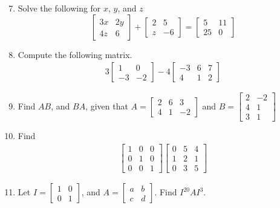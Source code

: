 \documentclass[12pt]{article}
\begin{document}
\begin{enumerate}
\setcounter{enumi}{6}

\item Solve the following for $x$, $y$, and $z$
\[\begin{bmatrix}
3x & 2y \\ 
4z & 6
\end{bmatrix} +
\begin{bmatrix}
2 & 5 \\
z & -6
\end{bmatrix} =
\begin{bmatrix}
5 & 11 \\
25 & 0
\end{bmatrix}\]

\item Compute the following matrix.
\begin{align*}
3\begin{bmatrix}
1 & 0 \\
-3 & -2
\end{bmatrix} -4
\begin{bmatrix}
-3 & 6 & 7\\
4  & 1 & 2
\end{bmatrix}
\end{align*}

\item Find $AB$, and $BA$, given that $A=\begin{bmatrix}
2 & 6 & 3 \\
4 & 1 & -2
\end{bmatrix}$ and $B=\begin{bmatrix}
2 & -2 \\
4 & 1 \\
3 & 1
\end{bmatrix}$

\item Find
\begin{align*}
	\begin{bmatrix}
		1 & 0 & 0 \\
		0 & 1 & 0 \\
		0 & 0 & 1
	\end{bmatrix}
	\begin{bmatrix}
		0 & 5 & 4 \\
		1 & 2 & 1 \\
		0 & 3 & 5
	\end{bmatrix}
\end{align*}

\item Let $I=\begin{bmatrix} 1 & 0 \\ 0 & 1 \end{bmatrix}$, and $A=\begin{bmatrix} a & b \\ c & d \end{bmatrix}$.  Find $I^{20}AI^{3}$.


\end{enumerate}
\end{document}
